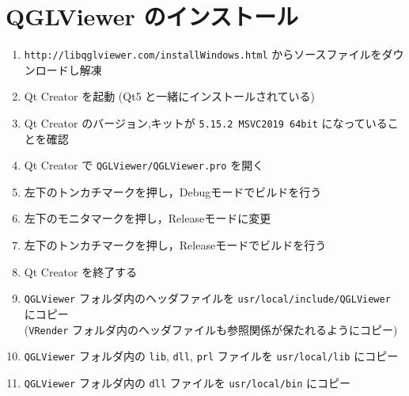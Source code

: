 \documentclass[dvipdfmx]{jsarticle}
\begin{document}
\section{QGLViewer のインストール}
\begin{enumerate}
	\item \verb|http://libqglviewer.com/installWindows.html| からソースファイルをダウンロードし解凍
	\item Qt Creator を起動 (Qt5 と一緒にインストールされている)
	\item Qt Creator のバージョン,キットが \verb|5.15.2 MSVC2019 64bit| になっていることを確認
	\item Qt Creator で \verb|QGLViewer/QGLViewer.pro| を開く
	\item 左下のトンカチマークを押し，Debugモードでビルドを行う
	\item 左下のモニタマークを押し，Releaseモードに変更
	\item 左下のトンカチマークを押し，Releaseモードでビルドを行う
	\item Qt Creator を終了する
	\item \verb|QGLViewer| フォルダ内のヘッダファイルを \verb|usr/local/include/QGLViewer| にコピー \\
		(\verb|VRender| フォルダ内のヘッダファイルも参照関係が保たれるようにコピー)
	\item \verb|QGLViewer| フォルダ内の \verb|lib|, \verb|dll|, \verb|prl| ファイルを \verb|usr/local/lib| にコピー
	\item \verb|QGLViewer| フォルダ内の \verb|dll| ファイルを \verb|usr/local/bin| にコピー
\end{enumerate}
\end{document}
